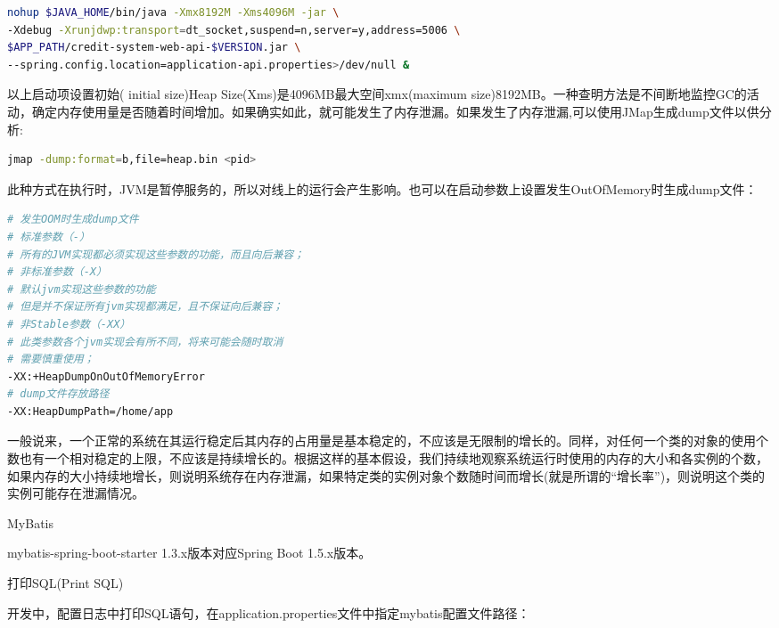 \documentclass[12pt]{book}
\makeatletter
\numberwithin{dummy}{section}
\theoremstyle{ocrenumbox}
\theoremstyle{blacknumex}
\theoremstyle{blacknumbox}
\theoremstyle{ocrenum}
\renewcommand{\section}{\@startsection{section}{1}{\z@}
	{-4ex \@plus -1ex \@minus -.4ex}
	{1ex \@plus.2ex }
	{\normalfont\large\sffamily\bfseries}}
\renewcommand{\subsection}{\@startsection {subsection}{2}{\z@}
	{-3ex \@plus -0.1ex \@minus -.4ex}
	{0.5ex \@plus.2ex }
	{\normalfont\sffamily\bfseries}}
\makeatother
\begin{document}
\begin{lstlisting}[language=Bash]
nohup $JAVA_HOME/bin/java -Xmx8192M -Xms4096M -jar \
-Xdebug -Xrunjdwp:transport=dt_socket,suspend=n,server=y,address=5006 \
$APP_PATH/credit-system-web-api-$VERSION.jar \
--spring.config.location=application-api.properties>/dev/null &
\end{lstlisting}

以上启动项设置初始( initial size)Heap Size(Xms)是4096MB最大空间xmx(maximum size)8192MB。一种查明方法是不间断地监控GC的活动，确定内存使用量是否随着时间增加。如果确实如此，就可能发生了内存泄漏。如果发生了内存泄漏,可以使用JMap生成dump文件以供分析:

\begin{lstlisting}[language=Bash]
jmap -dump:format=b,file=heap.bin <pid> 
\end{lstlisting}

此种方式在执行时，JVM是暂停服务的，所以对线上的运行会产生影响。也可以在启动参数上设置发生OutOfMemory时生成dump文件：

\begin{lstlisting}[language=Bash]
# 发生OOM时生成dump文件
# 标准参数（-）
# 所有的JVM实现都必须实现这些参数的功能，而且向后兼容；
# 非标准参数（-X）
# 默认jvm实现这些参数的功能
# 但是并不保证所有jvm实现都满足，且不保证向后兼容；
# 非Stable参数（-XX）
# 此类参数各个jvm实现会有所不同，将来可能会随时取消
# 需要慎重使用；
-XX:+HeapDumpOnOutOfMemoryError
# dump文件存放路径
-XX:HeapDumpPath=/home/app
\end{lstlisting}

一般说来，一个正常的系统在其运行稳定后其内存的占用量是基本稳定的，不应该是无限制的增长的。同样，对任何一个类的对象的使用个数也有一个相对稳定的上限，不应该是持续增长的。根据这样的基本假设，我们持续地观察系统运行时使用的内存的大小和各实例的个数，如果内存的大小持续地增长，则说明系统存在内存泄漏，如果特定类的实例对象个数随时间而增长(就是所谓的“增长率”)，则说明这个类的实例可能存在泄漏情况。

\section{MyBatis}

mybatis-spring-boot-starter 1.3.x版本对应Spring Boot 1.5.x版本。


\subsection{打印SQL(Print SQL)}

开发中，配置日志中打印SQL语句，在application.properties文件中指定mybatis配置文件路径：
\end{document}
